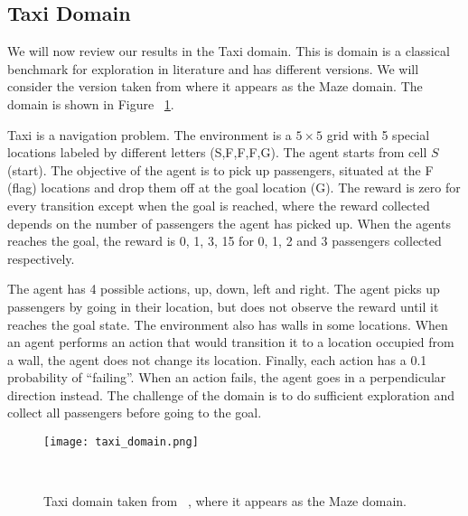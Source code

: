\subsection{Taxi Domain}
We will now review our results in the Taxi domain. This is domain is a classical benchmark for exploration in literature and has different versions. We will consider the version taken from \cite{Dearden98bayesianq-learning} where it appears as the Maze domain. The domain is shown in Figure ~\ref{fig:taxi_domain}.\par 
Taxi is a navigation problem. The environment is a $5\times5$ grid with 5 special locations labeled by different letters (S,F,F,F,G). The agent starts from cell $S$ (start). The objective of the agent is to pick up passengers, situated at the F (flag) locations and drop them off at the goal location (G). The reward is zero for every transition except when the goal is reached, where the reward collected depends on the number of passengers the agent has picked up.  When the agents reaches the goal, the reward is 0, 1, 3, 15 for 0, 1, 2 and 3 passengers collected respectively.\par 
The agent has 4 possible actions, up, down, left and right. The agent picks up passengers by going in their location, but does not observe the reward until it reaches the goal state. The environment also has walls in some locations. When an agent performs an action that would transition it to a location occupied from a wall, the agent does not change its location. Finally, each action has a 0.1 probability of ``failing''. When an action fails, the agent goes in a perpendicular direction instead. The challenge of the domain is to do sufficient exploration and collect all passengers before going to the goal.
\begin{figure}
 \texttt{[image: taxi\_domain.png]}
 \caption{Taxi domain taken from ~\cite{Dearden98bayesianq-learning}, where it appears as the Maze domain.} ~
 \label{fig:taxi_domain}
\end{figure}
